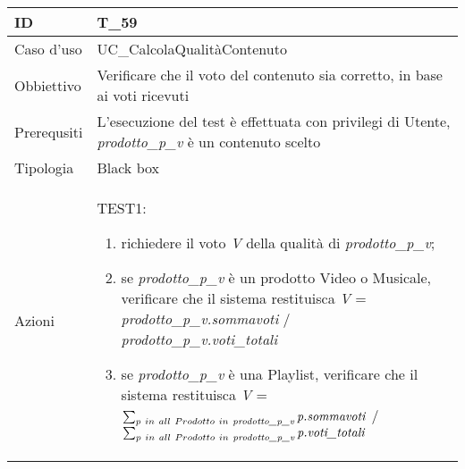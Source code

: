 \begin{table}[hb]
    \centering
    \begin{tabular}{ |p{2cm}|p{10cm}|  }
        \hline
        ID          & T\_59                                                                              \\\hline
        Caso d'uso  & UC\_CalcolaQualitàContenuto                                                        \\\hline
        Obbiettivo  & Verificare che il voto del contenuto sia corretto, in base ai voti ricevuti        \\\hline
        Prerequsiti & L'esecuzione del test è effettuata con privilegi di Utente, \emph{prodotto\_p\_v}
        è un contenuto scelto                                                                            \\\hline
        Tipologia   & Black box                                                                          \\\hline
        Azioni      &
        TEST1:
        \begin{enumerate}[nosep, topsep=0pt]
            \item richiedere il voto \emph{V} della qualità di \emph{prodotto\_p\_v};
            \item se \emph{prodotto\_p\_v} è un prodotto Video o Musicale,
                  verificare che il sistema restituisca \emph{V} = \emph{prodotto\_p\_v.sommavoti} / \emph{prodotto\_p\_v.voti\_totali}
            \item se \emph{prodotto\_p\_v} è una Playlist,
                  verificare che il sistema restituisca \emph{V} =
                  $\sum_{p\ in\ all\ Prodotto\ in\ \emph{prodotto\_p\_v}} \emph{p.sommavoti}$
                  /
                  $\sum_{p\ in\ all\ Prodotto\ in\ \emph{prodotto\_p\_v}} \emph{p.voti\_totali}$
        \end{enumerate}
        \\\hline
    \end{tabular}
\end{table}

